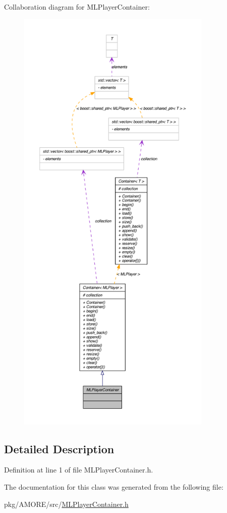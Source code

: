 Collaboration diagram for MLPlayerContainer:\nopagebreak
\begin{figure}[H]
\begin{center}
\leavevmode
\includegraphics[height=600pt]{class_m_l_player_container__coll__graph}
\end{center}
\end{figure}


\subsection{Detailed Description}


Definition at line 1 of file MLPlayerContainer.h.



The documentation for this class was generated from the following file:\begin{DoxyCompactItemize}
\item 
pkg/AMORE/src/\hyperlink{_m_l_player_container_8h}{MLPlayerContainer.h}\end{DoxyCompactItemize}

